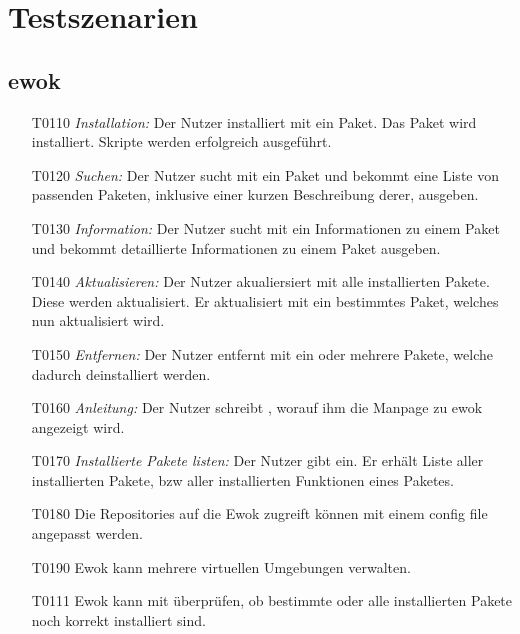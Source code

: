 \chapter{Testszenarien}

\section{ewok}

\begin{itemize}
	\item[T0110] \textit{Installation:} Der Nutzer installiert mit  ein Paket. Das Paket wird installiert. Skripte werden erfolgreich ausgeführt.
	\item[T0120] \textit{Suchen:} Der Nutzer sucht mit  ein Paket und bekommt eine Liste von passenden Paketen, inklusive einer kurzen Beschreibung derer, ausgeben.
	\item[T0130] \textit{Information:} Der Nutzer sucht mit  ein Informationen zu einem Paket und bekommt detaillierte Informationen zu einem Paket ausgeben.
	\item[T0140] \textit{Aktualisieren:} Der Nutzer akualiersiert mit  alle installierten Pakete. Diese werden aktualisiert. Er aktualisiert mit  ein bestimmtes Paket, welches nun aktualisiert wird.

	\item[T0150] \textit{Entfernen:} Der Nutzer entfernt mit  ein oder mehrere Pakete, welche dadurch deinstalliert werden.
	\item[T0160] \textit{Anleitung:} Der Nutzer schreibt , worauf ihm die Manpage zu ewok angezeigt wird.
	\item[T0170] \textit{Installierte Pakete listen:} Der Nutzer gibt  ein. Er erhält Liste aller installierten Pakete, bzw aller installierten Funktionen eines Paketes.
	\item[T0180] Die Repositories auf die Ewok zugreift können mit einem config file angepasst werden.
	\item[T0190] Ewok kann mehrere virtuellen Umgebungen verwalten. 
	\item[T0111] Ewok kann mit 	 überprüfen, ob bestimmte oder alle installierten Pakete noch korrekt installiert sind.


\end{itemize}

